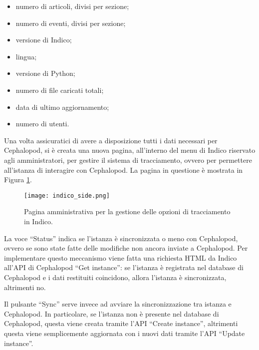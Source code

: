         \begin{itemize}
            \item numero di articoli, divisi per sezione;
            \item numero di eventi, divisi per sezione;
            \item versione di Indico;
            \item lingua;
            \item versione di Python;
            \item numero di file caricati totali;
            \item data di ultimo aggiornamento;
            \item numero di utenti.
        \end{itemize}
        
        Una volta assicuratici di avere a disposizione tutti i dati necessari per Cephalopod, si è creata una nuova pagina, all'interno del menu di Indico riservato agli amministratori, per gestire il sistema di tracciamento, ovvero per permettere all'istanza di interagire con Cephalopod. La pagina in questione è mostrata in Figura \ref{fig:indico_side}.
        
    	\begin{figure}[h!]
    		\begin{center}
    			\texttt{[image: indico\_side.png]}
    		\end{center}
    		\caption[Configurazione di Cephalopod in Indico]{Pagina amministrativa per la gestione delle opzioni di tracciamento in Indico.}
    		\label{fig:indico_side}
    	\end{figure}
    	
    	La voce ``Status'' indica se l'istanza è sincronizzata o meno con Cephalopod, ovvero se sono state fatte delle modifiche non ancora inviate a Cephalopod. Per implementare questo meccanismo viene fatta una richiesta \ac{HTML} da Indico all'\ac{API} di Cephalopod ``Get instance'': se l'istanza è registrata nel database di Cephalopod e i dati restituiti coincidono, allora l'istanza è sincronizzata, altrimenti no.
    	
    	Il pulsante ``Sync'' serve invece ad avviare la sincronizzazione tra istanza e Cephalopod. In particolare, se l'istanza non è presente nel database di Cephalopod, questa viene creata tramite l'\ac{API} ``Create instance'', altrimenti questa viene semplicemente aggiornata con i nuovi dati tramite l'\ac{API} ``Update instance''.
    	
